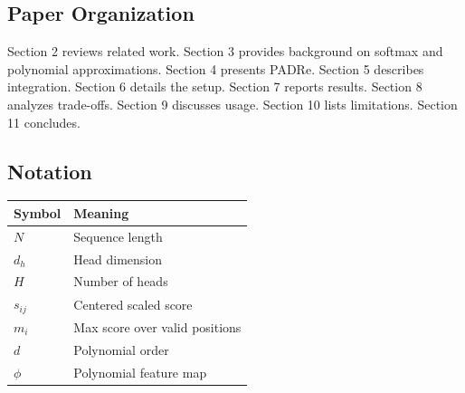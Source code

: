 \subsection{Paper Organization}

Section 2 reviews related work. Section 3 provides background on softmax 
and polynomial approximations. Section 4 presents PADRe. Section 5 describes 
integration. Section 6 details the setup. Section 7 reports results. Section 
8 analyzes trade-offs. Section 9 discusses usage. Section 10 lists 
limitations. Section 11 concludes.



\subsection{Notation}

\begin{table}[H]
\centering
\small
\begin{tabular}{ll}
\toprule
\textbf{Symbol} & \textbf{Meaning} \\
\midrule
$N$ & Sequence length \\
$d_h$ & Head dimension \\
$H$ & Number of heads \\
$s_{ij}$ & Centered scaled score \\
$m_i$ & Max score over valid positions \\
$d$ & Polynomial order \\
$\phi$ & Polynomial feature map \\
\bottomrule
\end{tabular}
\end{table}

